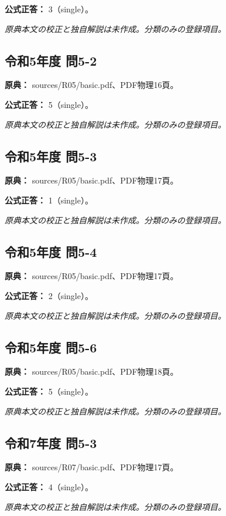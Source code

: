\textbf{公式正答：} 3（single）。

\par\textit{原典本文の校正と独自解説は未作成。分類のみの登録項目。}

\subsection{令和5年度 問5-2}
\label{q:r05-reg-basic-5-2}

\noindent\textbf{原典：} sources/R05/basic.pdf、PDF物理16頁。

\textbf{公式正答：} 5（single）。

\par\textit{原典本文の校正と独自解説は未作成。分類のみの登録項目。}

\subsection{令和5年度 問5-3}
\label{q:r05-reg-basic-5-3}

\noindent\textbf{原典：} sources/R05/basic.pdf、PDF物理17頁。

\textbf{公式正答：} 1（single）。

\par\textit{原典本文の校正と独自解説は未作成。分類のみの登録項目。}

\subsection{令和5年度 問5-4}
\label{q:r05-reg-basic-5-4}

\noindent\textbf{原典：} sources/R05/basic.pdf、PDF物理17頁。

\textbf{公式正答：} 2（single）。

\par\textit{原典本文の校正と独自解説は未作成。分類のみの登録項目。}

\subsection{令和5年度 問5-6}
\label{q:r05-reg-basic-5-6}

\noindent\textbf{原典：} sources/R05/basic.pdf、PDF物理18頁。

\textbf{公式正答：} 5（single）。

\par\textit{原典本文の校正と独自解説は未作成。分類のみの登録項目。}

\subsection{令和7年度 問5-3}
\label{q:r07-reg-basic-5-3}

\noindent\textbf{原典：} sources/R07/basic.pdf、PDF物理17頁。

\textbf{公式正答：} 4（single）。

\par\textit{原典本文の校正と独自解説は未作成。分類のみの登録項目。}
